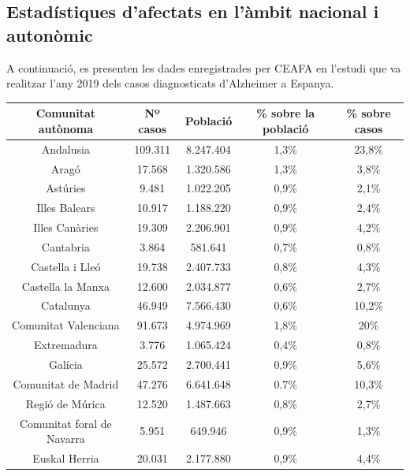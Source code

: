 \documentclass[a4paper,12pt]{article}
\begin{document}
\subsection*{Estadístiques d'afectats en l'àmbit nacional i autonòmic}
A continuació, es presenten les dades enregistrades per CEAFA en l'estudi que va realitzar l'any 2019 dels casos diagnosticats d'Alzheimer a Espanya.
\begin{table}[h]
    \centering
    \begin{tabular}{ |c | c | c | c | c| } 
        \hline
        \hline Comunitat autònoma & Nº casos & Població & \% sobre la població & \% sobre casos\\
        \hline
         Andalusia & 109.311 & 8.247.404 & 1,3\% & 23,8\% \\
         \hline
         Aragó & 17.568 & 1.320.586 & 1,3\% & 3,8\% \\
         \hline
         Astúries & 9.481 & 1.022.205 & 0,9\% & 2,1\% \\
         \hline
         Illes Balears & 10.917 & 1.188.220 & 0,9\% & 2,4\% \\
          \hline
         Illes Canàries & 19.309 & 2.206.901 & 0,9\% & 4,2\% \\
          \hline
         Cantabria & 3.864 & 581.641 & 0,7\% & 0,8\% \\
          \hline
         Castella i Lleó & 19.738 & 2.407.733 & 0,8\% & 4,3\% \\
          \hline
         Castella la Manxa & 12.600 & 2.034.877 & 0,6\% & 2,7\% \\
          \hline
         Catalunya & 46.949 & 7.566.430 & 0,6\% & 10,2\% \\
          \hline
         Comunitat Valenciana & 91.673 & 4.974.969 & 1,8\% & 20\% \\ 
          \hline
         Extremadura & 3.776 & 1.065.424 & 0,4\% & 0,8\% \\
          \hline
         Galícia & 25.572 & 2.700.441 & 0,9\% & 5,6\% \\ 
          \hline
         Comunitat de Madrid & 47.276 & 6.641.648 & 0.7\% & 10,3\% \\ 
         \hline
         Regió de Múrica & 12.520 & 1.487.663 & 0,8\% & 2,7\% \\
          \hline
         Comunitat foral de Navarra & 5.951 & 649.946 & 0,9\% & 1,3\% \\ 
          \hline
         Euskal Herria & 20.031 & 2.177.880 & 0,9\% & 4,4\% \\ 

\end{tabular}
\end{table}
\end{document}
